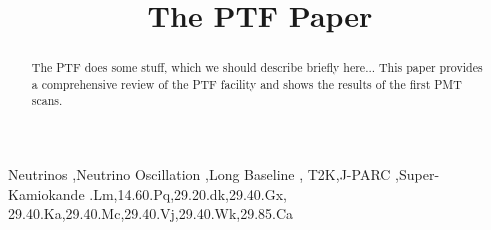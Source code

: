 \documentclass[final,5p,times,twocolumn,longtitle]{elsarticle-la}
\begin{document}



\long{}

\title{The PTF Paper}






%


\begin{abstract}
The PTF does some stuff, which we should describe briefly here...
This paper provides a comprehensive review of the PTF facility and shows the results of the first PMT scans. 
\end{abstract}

\begin{keyword}
Neutrinos \sep Neutrino Oscillation \sep Long Baseline \sep 
T2K\sep J-PARC \sep Super-Kamiokande
.Lm\sep 14.60.Pq\sep 29.20.dk\sep 29.40.Gx\sep 
      29.40.Ka\sep 29.40.Mc\sep 29.40.Vj\sep 29.40.Wk\sep 29.85.Ca 


\end{keyword}
\end{document}
